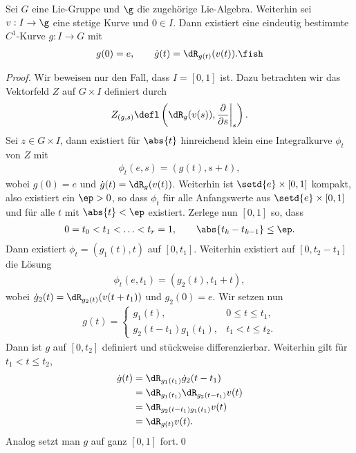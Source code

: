 \documentclass[%
	paper=a5,%
	fleqn,%
	DIV=18,%
	BCOR=0mm,
	fontsize=11pt,
	titlepage=false,%
	bibliography=totoc,
	DIV=18,%
	twoside=true,
	pdftitle=Riemannsche Geometrie,
	pdfauthor=Uwe Semmelmann,
	numbers=noendperiod]%
	{scrbook}
\begin{document}
\begin{lem}
Sei $G$ eine Lie-Gruppe und $\g$ die zugehörige Lie-Algebra. Weiterhin sei $v:
I \to \g$ eine stetige Kurve und $0\in I$. Dann existiert eine eindeutig
bestimmte $C^1$-Kurve $g: I\to G$ mit
\begin{align*}
g(0) = e,\qquad \dot{g}(t) = \dR_{g(t)}(v(t)).\fish
\end{align*} 
\end{lem}
\begin{proof}
Wir beweisen nur den Fall, dass $I=[0,1]$ ist. Dazu betrachten wir das
Vektorfeld $Z$ auf $G\times I$ definiert durch
\begin{align*}
Z_{(g,s)} \defl \left(\dR_g(v(s)),\frac{\partial}{\partial s}\bigg|_s\right).
\end{align*}
Sei $z\in G\times I$, dann existiert für $\abs{t}$ hinreichend klein eine
Integralkurve $\phi_t$ von $Z$ mit
\begin{align*}
\phi_t(e,s) = (g(t),s+t),
\end{align*} 
wobei $g(0) = e$ und $\dot{g}(t) = \dR_{g}(v(t))$. Weiterhin ist
$\setd{e}\times[0,1]$ kompakt, also existiert ein $\ep > 0$, so dass
$\phi_t$ für alle Anfangswerte aus $\setd{e}\times [0,1]$ und für alle
$t$ mit $\abs{t} < \ep$ existiert. Zerlege nun $[0,1]$ so, dass
\begin{align*}
0 = t_0 < t_1 < \ldots < t_r = 1,\qquad \abs{t_k-t_{k-1}} \le \ep.
\end{align*}
Dann existiert $\phi_t = (g_1(t),t)$ auf $[0,t_1]$. Weiterhin existiert auf
$[0,t_2-t_1]$ die Lösung
\begin{align*}
\phi_t(e,t_1) = (g_2(t),t_1+t),
\end{align*}
wobei $\dot{g}_2(t) = \dR_{g_2(t)}(v(t+t_1))$ und $g_2(0) = e$. Wir setzen nun
\begin{align*}
g(t) = \begin{cases}
g_1(t), & 0\le t \le t_1,\\
g_2(t-t_1)g_1(t_1), & t_1< t\le t_2. 
\end{cases}
\end{align*}
Dann ist $g$ auf $[0,t_2]$ definiert und stückweise differenzierbar. Weiterhin
gilt für $t_1< t \le t_2$,
\begin{align*}
\dot{g}(t) &= \dR_{g_1(t_1)}\dot{g}_2(t-t_1)\\
&=\dR_{g_1(t_1)}\dR_{g_2(t-t_1)}v(t)\\
&=\dR_{g_2(t-t_1)g_1(t_1)}v(t)\\
&=\dR_{g(t)}v(t).
\end{align*}
Analog setzt man $g$ auf ganz $[0,1]$ fort.\qed
\end{proof}
\end{document}

